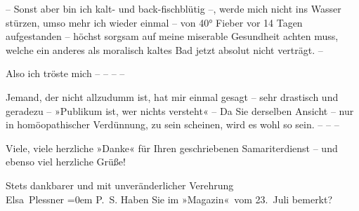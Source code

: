 \pstart
           – Sonst aber bin ich kalt- und back-fischblütig –, werde mich nicht ins Wasser stürzen,
          umso mehr ich wieder einmal – von 40° Fieber vor 14 Tagen aufgestanden –
          höchst sorgsam auf meine miserable Gesundheit achten muss, welche ein anderes als
          moralisch kaltes Bad jetzt absolut nicht verträgt. –\pend
           
\pstart
           {\pb}Also ich tröste mich – – – –\pend
           
\pstart
           Jemand, der nicht allzudumm ist, hat \introOben{}mir\introOben{} einmal gesagt – sehr
          drastisch und geradezu – »Publikum ist, wer nichts versteht« – Da Sie derselben Ansicht –
          nur in homöopathischer Verdünnung, zu sein scheinen, wird es wohl so sein. – – –\pend
           
\pstart
            Viele, viele herzliche »Danke« für Ihren geschriebenen Samariterdienst – und ebenso viel
          herzliche Grüße!\pend
           
\pstart
           Stets dankbarer und mit unveränderlicher Verehrung{\\[\baselineskip]}\spacefill\mbox{Elsa Plessner}\pend
           \leftskip=0em{}
\pstart
           \noindent{}P. S. Haben Sie \label{K_L03715-55v}\label{K_L03715-55} im »Magazin« vom 23. Juli
            bemerkt?\pend
           \endnumbering{}
\begin{anhang}
\end{anhang}
      